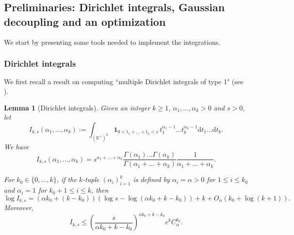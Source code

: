 \documentclass[a4paper,10pt,leqno]{amsart}
\numberwithin{equation}{section}
\newtheorem{lem}[prop]{Lemma}
\newcommand{\R}{\mathbb{R}}
\newcommand{\dd}{\mathrm{d}}
\def\indic{\mathbf{1}}
\begin{document}
\subsection{Preliminaries: Dirichlet integrals, Gaussian decoupling and an optimization}
We start by presenting some tools needed to implement the integrations.
\subsubsection*{Dirichlet integrals}We first recall a result on computing ``multiple Dirichlet integrals of type 1" (see \cite[p. 258]{whittaker_watson_1996}).
\begin{lem}[Dirichlet integrals]\label{lemdirichlet}
  Given an integer $k\geq 1$, $\alpha_1,\ldots,\alpha_k>0$ and $s>0$, let
  \begin{equation*}
    I_{k,s}(\alpha_1, \dots, \alpha_k) :=\int_{(\R^+)^k} \indic_{0<t_1+\ldots+t_k<s}\, t_1^{\alpha_1-1}\ldots t_k^{\alpha_k-1}\dd t_1\ldots \dd t_k.
  \end{equation*}
  We have
  \begin{equation}
    \label{eq:ind I}
    I_{k,s}(\alpha_1, \dots, \alpha_k) =s^{\alpha_1+\dots+ \alpha_k} \frac{\Gamma(\alpha_1)\ldots \Gamma(\alpha_k)}{\Gamma(\alpha_1+\ldots+\alpha_k)}\frac{1}{\alpha_1+\ldots+\alpha_k}.
  \end{equation}

  For $k_0\in\{0,\ldots,k\}$, if the $k$-tuple $(\alpha_i)_{i=1}^k$ is defined by $\alpha_i=\alpha>0$ for $1\le i\le k_0$ and $\alpha_i=1$ for $k_0+ 1\le i \le k$, then
  \begin{equation}\label{eq:estimate Dirichlet}
    \log I_{k,s}=(\alpha k_0+(k-k_0))\left( \log s- \log(\alpha k_0+k-k_0)\right)+k+O_\alpha(k_0+\log(k+1)).
  \end{equation}
  Moreover,
  \begin{equation*} I_{k,s}\le \left( \frac{s}{\alpha k_0 +k-k_0} \right)^{\alpha k_0+k-k_0}e^k C_\alpha^{k_0}.\end{equation*}
\end{lem}
\end{document}
